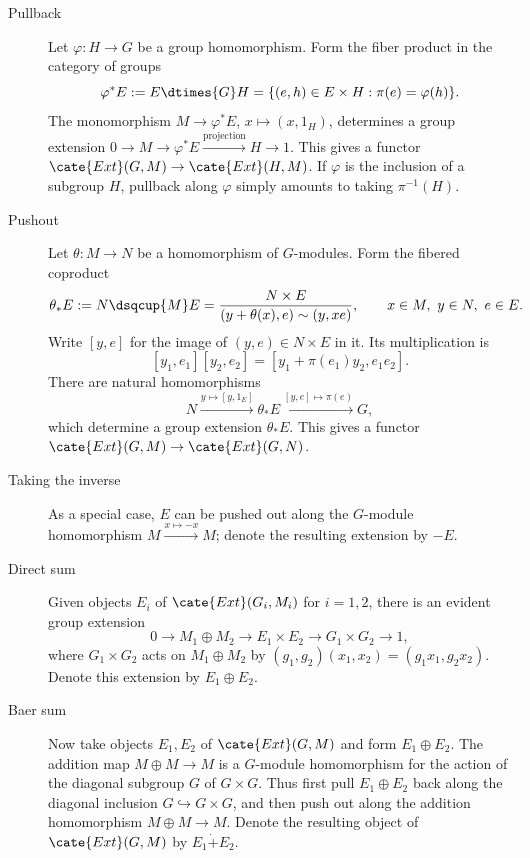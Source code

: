 \begin{description}
	\item[Pullback] Let $\varphi:H\to G$ be a group homomorphism. Form the
	fiber product in the category of groups
	\[ \varphi^*E:=E\dtimes{G}H
	=\{(e,h)\in E\times H:\pi(e)=\varphi(h)\}. \]
	The monomorphism $M\to\varphi^*E$, $x\mapsto(x,1_H)$, determines a group
	extension
	$0\to M\to\varphi^*E\xrightarrow{\text{projection}}H\to1$. This gives a
	functor $\cate{Ext}(G,M)\to\cate{Ext}(H,M)$. If $\varphi$ is the
	inclusion of a subgroup $H$, pullback along $\varphi$ simply amounts to
	taking $\pi^{-1}(H)$.

	\item[Pushout] Let $\theta:M\to N$ be a homomorphism of $G$-modules. Form
	the fibered coproduct
	\[ \theta_*E:=N\dsqcup{M}E
	=\frac{N\times E}{(y+\theta(x),e)\sim(y,xe)},
	\qquad x\in M,\ y\in N,\ e\in E. \]
	Write $[y,e]$ for the image of $(y,e)\in N\times E$ in it. Its
	multiplication is
	\[ [y_1,e_1][y_2,e_2]
	=[y_1+\pi(e_1)y_2,e_1e_2]. \]
	There are natural homomorphisms
	\[ N\xrightarrow{y\mapsto[y,1_E]}\theta_*E
	\xrightarrow{[y,e]\mapsto\pi(e)}G, \]
	which determine a group extension $\theta_*E$. This gives a functor
	$\cate{Ext}(G,M)\to\cate{Ext}(G,N)$.

	\item[Taking the inverse] As a special case, $E$ can be pushed out along
	the $G$-module homomorphism $M\xrightarrow{x\mapsto-x}M$; denote the
	resulting extension by $-E$.

	\item[Direct sum] Given objects $E_i$ of $\cate{Ext}(G_i,M_i)$ for
	$i=1,2$, there is an evident group extension
	\[ 0\to M_1\oplus M_2\to E_1\times E_2\to G_1\times G_2\to1, \]
	where $G_1\times G_2$ acts on $M_1\oplus M_2$ by
	$(g_1,g_2)(x_1,x_2)=(g_1x_1,g_2x_2)$. Denote this extension by
	$E_1\oplus E_2$.

	\item[Baer sum] Now take objects $E_1,E_2$ of $\cate{Ext}(G,M)$ and form
	$E_1\oplus E_2$. The addition map $M\oplus M\to M$ is a $G$-module
	homomorphism for the action of the diagonal subgroup $G$ of $G\times G$.
	Thus first pull $E_1\oplus E_2$ back along the diagonal inclusion
	$G\hookrightarrow G\times G$, and then push out along the addition
	homomorphism $M\oplus M\to M$. Denote the resulting object of
	$\cate{Ext}(G,M)$ by $E_1\dot{+}E_2$.
\end{description}

